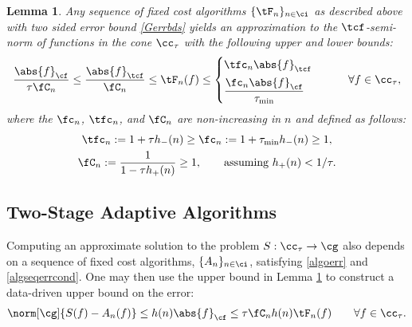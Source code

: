 \documentclass[]{elsarticle}
\newtheorem{lem}{Lemma}
\theoremstyle{definition}
\theoremstyle{remark}
\newcommand{\Fnorm}[1]{\abs{#1}_{\cf}}
\newcommand{\Ftnorm}[1]{\abs{#1}_{\tcf}}
\begin{document}
\begin{lem} \label{Gnormlem} Any sequence of fixed cost algorithms  $\{\tF_n\}_{n \in \ci}$ as described above with two sided error bound \eqref{Gerrbds} yields an approximation to the $\tcf$-semi-norm of functions in the cone $\cc_{\tau}$ with the following upper and lower bounds:
\begin{equation} \label{twosidedGineq}
 \frac{\Fnorm{f}}{\tau \fC_n}  \le \frac{\Ftnorm{f}}{\fC_n}  \le \tF_n(f) \le  \begin{cases} \tfc_n \Ftnorm{f} \\[1ex]
\displaystyle \frac{\fc_n \Fnorm{f} }{\tau_{\min}}
\end{cases} \qquad \forall f \in \cc_{\tau},
\end{equation}
where the $\fc_n$, $\tfc_n$, and $\fC_n$ are non-increasing in $n$ and defined as follows:
\begin{gather} \label{normdeflate}
\tfc_n :=1 + \tau h_{ -}(n)  \ge \fc_n :=1 + \tau_{\min} h_{ -}(n)  \ge 1, \\
\label{norminflate}
\fC_n :=\frac{1}{1 - \tau h_{ +}(n)} \ge 1, \qquad \text{assuming } h_{ +}(n) < 1/\tau.
\end{gather}
\end{lem}

\subsection{Two-Stage Adaptive Algorithms} \label{twostagesec}

Computing an approximate solution to the problem $S: \cc_{\tau} \to \cg$ also depends on a sequence of fixed cost algorithms, $\{A_n\}_{n \in \ci}$, satisfying \eqref{algoerr} and \eqref{algseqerrcond}.  One may then use the upper bound in Lemma \ref{Gnormlem} to construct a data-driven upper bound on the error:
\begin{equation} \label{Anerrbound}
\norm[\cg]{S(f) -  A_n(f)} \le h(n)\Fnorm{f} \le \tau  \fC_n h(n)\tF_n(f) \qquad \forall f \in \cc_{\tau}.
\end{equation}
\end{document}

